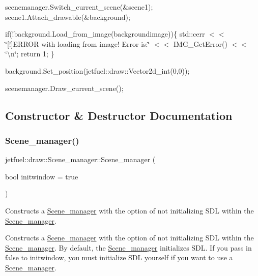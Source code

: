scenemanager.\+Switch\+\_\+current\+\_\+scene(\&scene1); scene1.\+Attach\+\_\+drawable(\&background);

if(!background.Load\+\_\+from\+\_\+image(backgroundimage))\{ std\+::cerr $<$$<$ \char`\"{}\mbox{[}!\mbox{]}\+E\+R\+R\+O\+R with loading from image! Error is\+:\char`\"{} $<$$<$ I\+M\+G\+\_\+\+Get\+Error() $<$$<$ \char`\"{}\textbackslash{}n\char`\"{}; return 1; \}

background.\+Set\+\_\+position(jetfuel\+::draw\+::\+Vector2d\+\_\+int(0,0));

scenemanager.\+Draw\+\_\+current\+\_\+scene(); 

\subsection{Constructor \& Destructor Documentation}
\mbox{\label{classjetfuel_1_1draw_1_1Scene__manager_ae2b2c07e8d9a7d2fa34b03f4c117e0c9}} 
\subsubsection{\texorpdfstring{Scene\+\_\+manager()}{Scene\_manager()}}
{\footnotesize\ttfamily jetfuel\+::draw\+::\+Scene\+\_\+manager\+::\+Scene\+\_\+manager (\begin{DoxyParamCaption}\item[{bool}]{initwindow = {\ttfamily true} }\end{DoxyParamCaption})}



Constructs a \hyperlink{classjetfuel_1_1draw_1_1Scene__manager}{Scene\+\_\+manager} with the option of not initializing S\+DL within the \hyperlink{classjetfuel_1_1draw_1_1Scene__manager}{Scene\+\_\+manager}. 

Constructs a \hyperlink{classjetfuel_1_1draw_1_1Scene__manager}{Scene\+\_\+manager} with the option of not initializing S\+DL within the \hyperlink{classjetfuel_1_1draw_1_1Scene__manager}{Scene\+\_\+manager}. By default, the \hyperlink{classjetfuel_1_1draw_1_1Scene__manager}{Scene\+\_\+manager} initializes S\+DL. If you pass in false to initwindow, you must initialize S\+DL yourself if you want to use a \hyperlink{classjetfuel_1_1draw_1_1Scene__manager}{Scene\+\_\+manager}.


